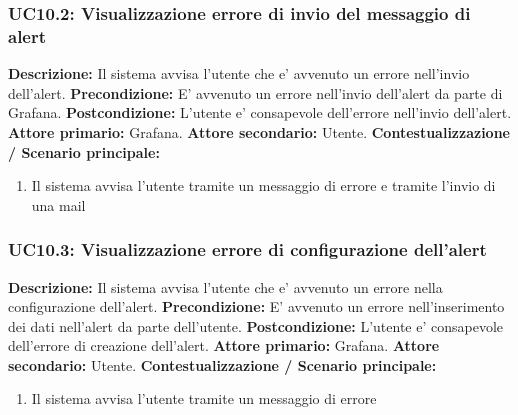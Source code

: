                 \subsubsection{UC10.2: Visualizzazione errore di invio del messaggio di alert}
                    \textbf{Descrizione:} Il sistema avvisa l’utente che e’ avvenuto un errore nell’invio dell’alert.
                    \newline
                    \textbf{Precondizione:} E’ avvenuto un errore nell’invio dell’alert da parte di Grafana.
                    \newline
                    \textbf{Postcondizione:} L’utente e’ consapevole dell’errore nell’invio dell’alert.
                    \newline
                    \textbf{Attore primario:} Grafana.
                    \newline
                    \textbf{Attore secondario:} Utente.
                    \newline
                    \textbf{Contestualizzazione / Scenario principale:} \begin{enumerate}
                            \item Il sistema avvisa l’utente tramite un messaggio di errore e tramite l’invio di una mail
                        \end{enumerate}
                        
                \subsubsection{UC10.3: Visualizzazione errore di configurazione dell’alert}
                    \textbf{Descrizione:} Il sistema avvisa l’utente che e’ avvenuto un errore nella configurazione dell’alert.
                    \newline
                    \textbf{Precondizione:}  E’ avvenuto un errore nell’inserimento dei dati nell’alert da parte dell’utente.
                    \newline
                    \textbf{Postcondizione:} L’utente e’ consapevole dell’errore di creazione dell’alert.
                    \newline
                    \textbf{Attore primario:} Grafana.
                    \newline
                    \textbf{Attore secondario:} Utente.
                    \newline
                    \textbf{Contestualizzazione / Scenario principale:} \begin{enumerate}
                            \item Il sistema avvisa l’utente tramite un messaggio di errore
                        \end{enumerate}
